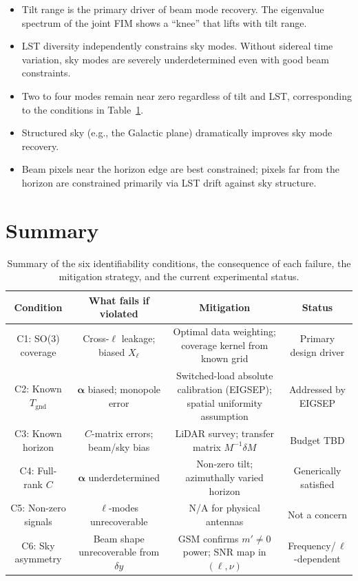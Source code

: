 \documentclass{aastex631}
\newcommand{\Tgnd}{T_\mathrm{gnd}}
\theoremstyle{plain}
\theoremstyle{remark}
\begin{document}
\begin{itemize}
  \item Tilt range is the primary driver of beam mode recovery.
    The eigenvalue spectrum of the joint FIM shows a ``knee'' that
    lifts with tilt range.
  \item LST diversity independently constrains sky modes.
    Without sidereal time variation, sky modes are severely
    underdetermined even with good beam constraints.
  \item Two to four modes remain near zero regardless of tilt and LST,
    corresponding to the conditions in Table~\ref{tab:conditions}.
  \item Structured sky (e.g., the Galactic plane) dramatically improves
    sky mode recovery.
  \item Beam pixels near the horizon edge are best constrained;
    pixels far from the horizon are constrained primarily via LST
    drift against sky structure.
\end{itemize}

\section{Summary} \label{sec:summary}

\begin{table}
  \centering
  \begin{tabular}{c|c|c|c}
    \toprule
    \textbf{Condition} & \textbf{What fails if violated}
      & \textbf{Mitigation} & \textbf{Status} \\
    \midrule
    C1: SO(3) coverage
      & Cross-$\ell$ leakage; biased $X_\ell$
      & Optimal data weighting; coverage kernel from known grid
      & Primary design driver \\[4pt]
    \hline
    C2: Known $\Tgnd$
      & $\boldsymbol{\alpha}$ biased; monopole error
      & Switched-load absolute calibration (EIGSEP);
        spatial uniformity assumption
      & Addressed by EIGSEP \\[4pt]
    \hline
    C3: Known horizon
      & $C$-matrix errors; beam/sky bias
      & LiDAR survey; transfer matrix $M^{-1}\delta M$
      & Budget TBD \\[4pt]
    \hline
    C4: Full-rank $C$
      & $\boldsymbol{\alpha}$ underdetermined
      & Non-zero tilt; azimuthally varied horizon
      & Generically satisfied \\[4pt]
    \hline
    C5: Non-zero signals
      & $\ell$-modes unrecoverable
      & N/A for physical antennas
      & Not a concern \\[4pt]
    \hline
    C6: Sky asymmetry
      & Beam shape unrecoverable from $\delta y$
      & GSM confirms $m'\neq 0$ power; SNR map in $(\ell,\nu)$
      & Frequency/\,$\ell$-dependent \\
    \bottomrule
  \end{tabular}
  \caption{Summary of the six identifiability conditions, the
    consequence of each failure, the mitigation strategy, and the
    current experimental status.}
  \label{tab:conditions}
\end{table}
\end{document}
